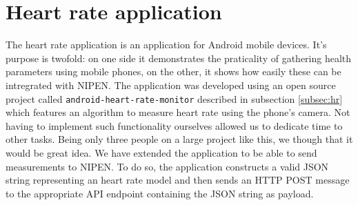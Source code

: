 \section{Heart rate application}

The heart rate application is an application for Android mobile devices.
It's purpose is twofold: on one side it demonstrates the praticality of gathering health parameters using mobile phones,
on the other, it shows how easily these can be intregrated with NIPEN. %
The application was developed using an open source project called \verb|android-heart-rate-monitor| described
in subsection \ref{subsec:hr} which features an algorithm to measure heart rate using the phone's camera.
Not having to implement such functionality ourselves allowed us to dedicate time to other tasks.
Being only three people on a large project like this, we though that it would be great idea.
We have extended the application to be able to send measurements to NIPEN.
To do so, the application constructs a valid JSON string representing an heart rate model and then
sends an HTTP POST message to the appropriate API endpoint containing the JSON string as payload.

